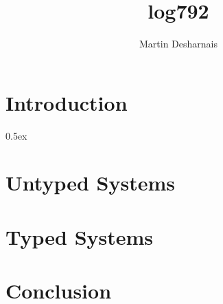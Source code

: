 \documentclass[11pt,a4paper]{report}
\begin{document}
\title{log792}
\author{Martin Desharnais}

\maketitle

\tableofcontents

\cleardoublepage{}
\pagestyle{headings}

\part{Introduction}




\parindent 0pt\parskip 0.5ex

\part{Untyped Systems}



\part{Typed Systems}



\part{Conclusion}


%
%
\end{document}
